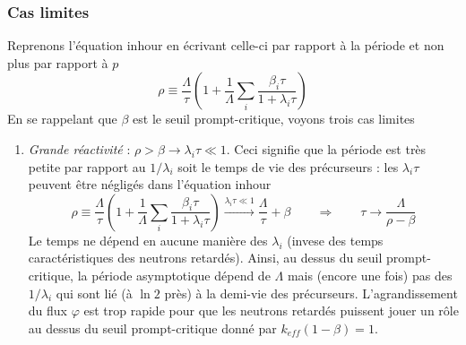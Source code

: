 \subsubsection{Cas limites}
Reprenons l'équation inhour en écrivant celle-ci par rapport à la période et non plus par rapport 
à $p$
\begin{equation}
\rho  \equiv \frac{\Lambda }{\tau }\left(    1 + \frac{1}{\Lambda }\sum\limits_i    \frac{{{\beta _i}\tau }}{{1 + {\lambda _i}\tau }}    \right)
\end{equation}
En se rappelant que $\beta$ est le seuil prompt-critique, voyons trois cas limites
\begin{enumerate}
\item \textit{Grande réactivité} : $\rho > \beta \to \lambda_i\tau \ll 1$. Ceci signifie que la 
période est très petite par rapport au $1/\lambda_i$ soit le temps de vie des précurseurs : les
$\lambda_i\tau$ peuvent être négligés dans l'équation inhour
\begin{equation}
\rho  \equiv \frac{\Lambda }{\tau }\left(   1 + \frac{1}{\Lambda }\sum\limits_i    \frac{{{\beta _i}\tau }}{{1 + {\lambda _i}\tau }}    \right)\overset{\lambda_i\tau\ll 1}{\longrightarrow}  \frac{\Lambda }{\tau } + \beta \qquad\Rightarrow\qquad \tau\longrightarrow \frac{\Lambda }{{\rho  - \beta }}
\end{equation}
Le temps ne dépend en aucune manière des $\lambda_i$ (invese des temps caractéristiques des neutrons
retardés). Ainsi, au dessus du seuil prompt-critique, la période asymptotique dépend de $\Lambda$ mais
(encore une fois) pas des $1/\lambda_i$ qui sont lié (à $\ln 2$ près) à la demi-vie des précurseurs. 
L'agrandissement du flux $\varphi$ est trop rapide pour que les neutrons retardés puissent jouer un rôle au dessus du seuil prompt-critique donné par $k_{eff}(1-\beta)=1$.


\end{enumerate}
